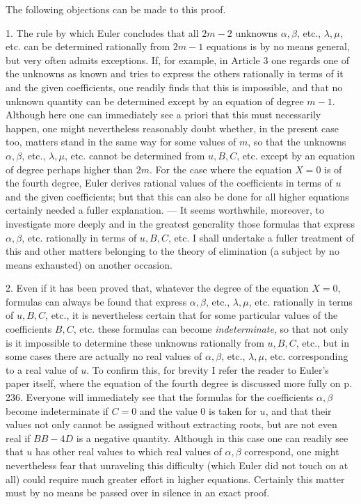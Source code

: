 The following objections can be made to this proof.

1. The rule by which Euler concludes that all $2m-2$ unknowns $\alpha,\beta$, etc., $\lambda,\mu$, etc. can be determined rationally from $2m-1$ equations is by no means general, but very often admits exceptions. If, for example, in Article 3 one regards one of the unknowns as known and tries to express the others rationally in terms of it and the given coefficients, one readily finds that this is impossible, and that no unknown quantity can be determined except by an equation of degree $m-1$. Although here one can immediately see a priori that this must necessarily happen, one might nevertheless reasonably doubt whether, in the present case too, matters stand in the same way for some values of $m$, so that the unknowns $\alpha,\beta$, etc., $\lambda,\mu$, etc. cannot be determined from $u,B,C$, etc. except by an equation of degree perhaps higher than $2m$. For the case where the equation \mbox{$X=0$} is of the fourth degree, Euler derives rational values of the coefficients in terms of $u$ and the given coefficients; but that this can also be done for all higher equations certainly needed a fuller explanation. --- It seems worthwhile, moreover, to investigate more deeply and in the greatest generality those formulas that express $\alpha,\beta$, etc. rationally in terms of $u,B,C$, etc. I shall undertake a fuller treatment of this and other matters belonging to the theory of elimination (a subject by no means exhausted) on another occasion.

2. Even if it has been proved that, whatever the degree of the equation \mbox{$X=0$}, formulas can always be found that express $\alpha,\beta$, etc., $\lambda,\mu$, etc. rationally in terms of $u,B,C$, etc., it is nevertheless certain that for some particular values of the coefficients $B,C$, etc. these formulas can become \textit{indeterminate}, so that not only is it impossible to determine these unknowns rationally from $u,B,C$, etc., but in some cases there are actually no real values of $\alpha,\beta$, etc., $\lambda,\mu$, etc. corresponding to a real value of $u$. To confirm this, for brevity I refer the reader to Euler's paper itself, where the equation of the fourth degree is discussed more fully on p. 236. Everyone will immediately see that the formulas for the coefficients $\alpha,\beta$ become indeterminate if $C=0$ and the value $0$ is taken for $u$, and that their values not only cannot be assigned without extracting roots, but are not even real if $BB-4D$ is a negative quantity. Although in this case one can readily see that $u$ has other real values to which real values of $\alpha,\beta$ correspond, one might nevertheless fear that unraveling this difficulty (which Euler did not touch on at all) could require much greater effort in higher equations. Certainly this matter must by no means be passed over in silence in an exact proof.

